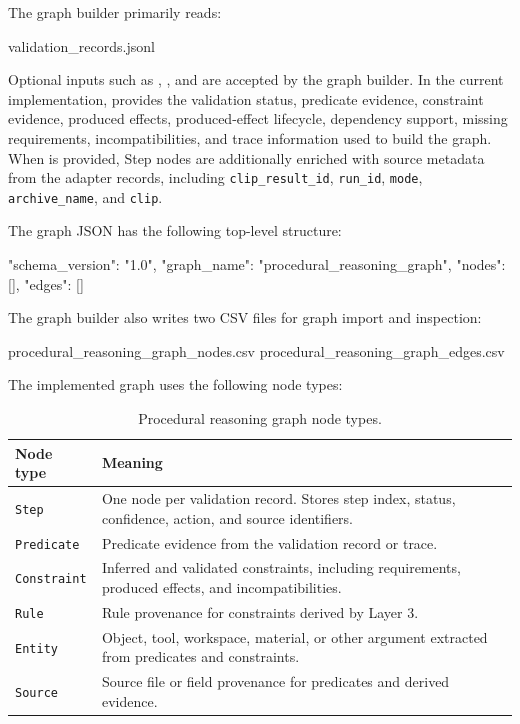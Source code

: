 The graph builder primarily reads:

\begin{Code}
    validation_records.jsonl
\end{Code}

Optional inputs such as , , and  are accepted by the graph builder. In the current implementation,  provides the validation status, predicate evidence, constraint evidence, produced effects, produced-effect lifecycle, dependency support, missing requirements, incompatibilities, and trace information used to build the graph. When  is provided, Step nodes are additionally enriched with source metadata from the adapter records, including \texttt{clip\_result\_id}, \texttt{run\_id}, \texttt{mode}, \texttt{archive\_name}, and \texttt{clip}.

The graph JSON has the following top-level structure:

\begin{Code}
{
  "schema_version": "1.0",
  "graph_name": "procedural_reasoning_graph",
  "nodes": [],
  "edges": []
}
\end{Code}

The graph builder also writes two CSV files for graph import and inspection:

\begin{Code}
    procedural_reasoning_graph_nodes.csv
    procedural_reasoning_graph_edges.csv
\end{Code}

The implemented graph uses the following node types:

\begin{table}[htbp]
\centering
\caption{Procedural reasoning graph node types.}
\label{tab:implementation-graph-nodes}
\begin{tabular}{p{} p{}}
\toprule
Node type & Meaning \\
\midrule
\texttt{Step} & One node per validation record. Stores step index, status, confidence, action, and source identifiers. \\
\texttt{Predicate} & Predicate evidence from the validation record or trace. \\
\texttt{Constraint} & Inferred and validated constraints, including requirements, produced effects, and incompatibilities. \\
\texttt{Rule} & Rule provenance for constraints derived by Layer 3. \\
\texttt{Entity} & Object, tool, workspace, material, or other argument extracted from predicates and constraints. \\
\texttt{Source} & Source file or field provenance for predicates and derived evidence. \\
\bottomrule
\end{tabular}
\end{table}

